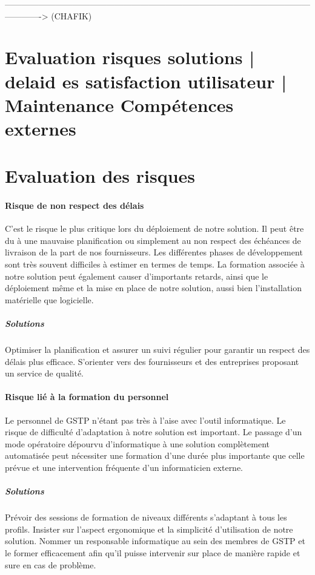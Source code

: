 \begin{description}
-------------------------------------------------------------------------------------------------------------------------> (CHAFIK)
\section{Evaluation risques solutions | delaid es satisfaction utilisateur | Maintenance Compétences externes}

\section{Evaluation des risques}

\paragraph{Risque de non respect des délais\\}
C'est le risque le plus critique lors du déploiement de notre solution. Il peut être du à une mauvaise planification ou simplement au non respect des échéances de livraison de la part de nos fournisseurs. Les différentes phases de développement sont très souvent difficiles à estimer en termes de temps.
La formation associée à notre solution peut également causer d'importants retards, ainsi que le déploiement même et la mise en place de notre solution, aussi bien l'installation matérielle que logicielle.

\subparagraph{Solutions\\}
Optimiser la planification et assurer un suivi régulier pour garantir un respect des délais plus efficace. S'orienter vers des fournisseurs et des entreprises proposant un service de qualité.

\paragraph{Risque lié à la formation du personnel\\}
Le personnel de GSTP n'étant pas très à l'aise avec l'outil informatique. Le risque de difficulté d'adaptation à notre solution est important. Le passage d'un mode opératoire dépourvu d'informatique à une solution complètement automatisée peut nécessiter une formation d'une durée plus importante que celle prévue et une intervention fréquente d'un informaticien externe.

\subparagraph{Solutions\\}
Prévoir des sessions de formation de niveaux différents s'adaptant à tous les profils. Insister sur l'aspect ergonomique et la simplicité d'utilisation
de notre solution. Nommer un responsable informatique au sein des membres de GSTP et le former efficacement afin qu'il puisse intervenir sur place de manière rapide et sure en cas de problème.



\end{description}
